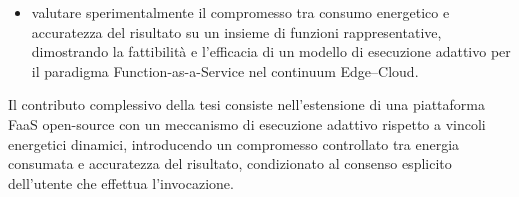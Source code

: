 \begin{itemize}
  \item valutare sperimentalmente il compromesso tra consumo
  energetico e accuratezza del risultato su un insieme di funzioni
  rappresentative, dimostrando la fattibilità e l'efficacia
  di un modello di esecuzione adattivo per il paradigma
  Function-as-a-Service nel continuum Edge--Cloud.

\end{itemize}

Il contributo complessivo della tesi consiste nell'estensione
di una piattaforma FaaS open-source con un meccanismo di esecuzione
adattivo rispetto a vincoli energetici dinamici, introducendo
un compromesso controllato tra energia consumata e accuratezza
del risultato, condizionato al consenso esplicito dell'utente
che effettua l'invocazione.
